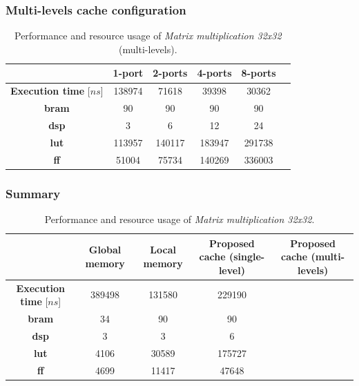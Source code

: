 \documentclass[11pt,a4paper,oneside]{memoir}
\begin{document}
\subsubsection{Multi-levels cache configuration}
\begin{table}[H]
	\begin{center}
		\begin{tabular}{cccccc}
			\hline
			\rowcolor{gray!50}
			& \textbf{1-port} & \textbf{2-ports} & \textbf{4-ports}
			& \textbf{8-ports} \\
			\hline
			\textbf{Execution time} [$ns$] & 138974 & 71618 & 39398
			& 30362 \\
			\rowcolor{gray!25}
			\textbf{\ac{bram}} & 90 & 90 & 90 & 90 \\
			\textbf{\acs{dsp}} & 3 & 6 & 12 & 24 \\
			\rowcolor{gray!25}
			\textbf{\acs{lut}} & 113957 & 140117 & 183947 & 291738 \\
			\textbf{\acs{ff}} & 51004 & 75734 & 140269 & 336003 \\
			\hline
		\end{tabular}
	\end{center}
	\caption{Performance and resource usage of \emph{Matrix multiplication
	32x32} (multi-levels).}
	\label{tab:matmul_32_l1_report}
\end{table}

\subsubsection{Summary}
\begin{table}[H]
	\begin{center}
		\begin{tabularx}{\textwidth}{CCCCC}
			\hline
			& \textbf{Global memory} & \textbf{Local memory} &
			\textbf{Proposed cache (single-level)} &
			\textbf{Proposed cache (multi-levels)} \\
			\hline
			\textbf{Execution time} [$ns$] & 389498 & 131580 & 229190 & \\
			\textbf{\ac{bram}} & 34 & 90 & 90 &  \\
			\textbf{\acs{dsp}} & 3 & 3 & 6 & \\
			\textbf{\acs{lut}} & 4106 & 30589 & 175727 & \\
			\textbf{\acs{ff}} & 4699 & 11417 & 47648 & \\
			\hline
		\end{tabularx}
	\end{center}
	\caption{Performance and resource usage of \emph{Matrix multiplication
	32x32}.}
	\label{tab:matmul_32_report}
\end{table}
\end{document}
